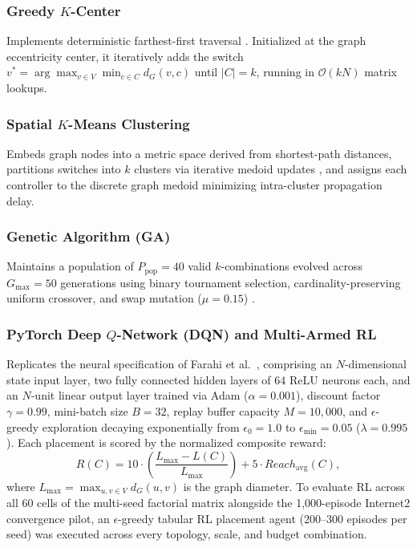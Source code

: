 \documentclass[conference]{IEEEtran}
\begin{document}
\subsubsection{Greedy $K$-Center}
Implements deterministic farthest-first traversal \cite{mohanty2021, vardhan2025}. Initialized at the graph eccentricity center, it iteratively adds the switch $v^* = \arg\max_{v \in V} \min_{c \in C} d_G(v, c)$ until $|C| = k$, running in $\mathcal{O}(kN)$ matrix lookups.

\subsubsection{Spatial $K$-Means Clustering}
Embeds graph nodes into a metric space derived from shortest-path distances, partitions switches into $k$ clusters via iterative medoid updates \cite{xiao2021, priya2025}, and assigns each controller to the discrete graph medoid minimizing intra-cluster propagation delay.

\subsubsection{Genetic Algorithm (GA)}
Maintains a population of $P_{\text{pop}} = 40$ valid $k$-combinations evolved across $G_{\max} = 50$ generations using binary tournament selection, cardinality-preserving uniform crossover, and swap mutation ($\mu = 0.15$) \cite{boudi2026, radam2022, xu2023}.

\subsubsection{PyTorch Deep $Q$-Network (DQN) and Multi-Armed RL}
Replicates the neural specification of Farahi et al.\ \cite{farahi2026}, comprising an $N$-dimensional state input layer, two fully connected hidden layers of $64$ ReLU neurons each, and an $N$-unit linear output layer trained via Adam ($\alpha = 0.001$), discount factor $\gamma = 0.99$, mini-batch size $B = 32$, replay buffer capacity $M = 10{,}000$, and $\epsilon$-greedy exploration decaying exponentially from $\epsilon_0 = 1.0$ to $\epsilon_{\min} = 0.05$ ($\lambda = 0.995$). Each placement is scored by the normalized composite reward:
\begin{equation}
R(C) = 10 \cdot \left( \frac{L_{\max} - L(C)}{L_{\max}} \right) + 5 \cdot Reach_{\text{avg}}(C),
\label{eq:reward}
\end{equation}
where $L_{\max} = \max_{u,v \in V} d_G(u, v)$ is the graph diameter. To evaluate RL across all 60 cells of the multi-seed factorial matrix alongside the 1,000-episode Internet2 convergence pilot, an $\epsilon$-greedy tabular RL placement agent ($200\text{--}300$ episodes per seed) was executed across every topology, scale, and budget combination.
\end{document}
